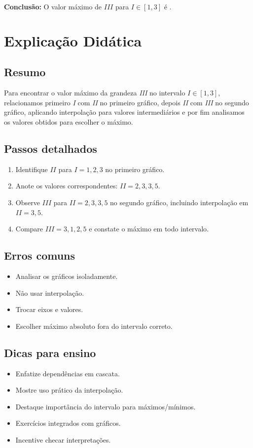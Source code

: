 \documentclass{article}
\begin{document}
\textbf{Conclusão:} O valor máximo de \(III\) para \(I \in [1,3]\) é .

\section{Explicação Didática}

\subsection*{Resumo}
Para encontrar o valor máximo da grandeza \textit{III} no intervalo \(I \in [1,3]\), relacionamos primeiro \textit{I} com \textit{II} no primeiro gráfico, depois \textit{II} com \textit{III} no segundo gráfico, aplicando interpolação para valores intermediários e por fim analisamos os valores obtidos para escolher o máximo.

\subsection*{Passos detalhados}
\begin{enumerate}
\item Identifique \(II\) para \(I=1,2,3\) no primeiro gráfico.
\item Anote os valores correspondentes: \(II=2,3,3,5\).
\item Observe \(III\) para \(II=2,3,3,5\) no segundo gráfico, incluindo interpolação em \(II=3,5\).
\item Compare \(III=3,1,2,5\) e constate o máximo em todo intervalo.
\end{enumerate}

\subsection*{Erros comuns}
\begin{itemize}
\item Analisar os gráficos isoladamente.
\item Não usar interpolação.
\item Trocar eixos e valores.
\item Escolher máximo absoluto fora do intervalo correto.
\end{itemize}

\subsection*{Dicas para ensino}
\begin{itemize}
\item Enfatize dependências em cascata.
\item Mostre uso prático da interpolação.
\item Destaque importância do intervalo para máximos/mínimos.
\item Exercícios integrados com gráficos.
\item Incentive checar interpretações.
\end{itemize}
\end{document}
